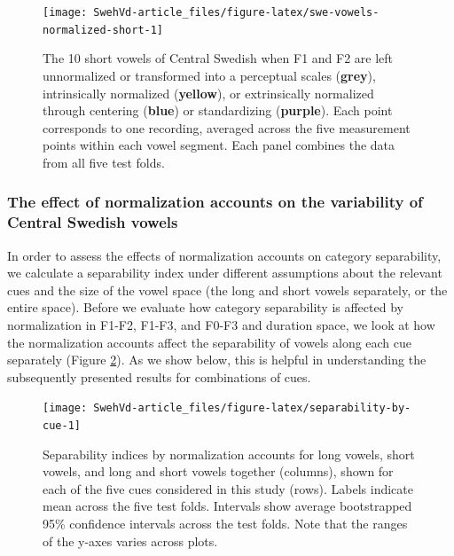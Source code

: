 \documentclass[utf8]{frontiersSCNS}
\begin{document}
\begin{landscape}
\begin{figure}

{\centering \texttt{[image: SwehVd-article\_files/figure-latex/swe-vowels-normalized-short-1]} 

}

\caption{The 10 short vowels of Central Swedish when F1 and F2 are left unnormalized or transformed into a perceptual scales (\textbf{grey}), intrinsically normalized (\textbf{yellow}), or extrinsically normalized through centering (\textbf{blue}) or standardizing (\textbf{purple}). Each point corresponds to one recording, averaged across the five measurement points within each vowel segment. Each panel combines the data from all five test folds.}\label{fig:swe-vowels-normalized-short}
\end{figure}

\end{landscape}

\hypertarget{sec:normVariability}{%
\subsubsection*{The effect of normalization accounts on the variability of Central Swedish vowels}\label{sec:normVariability}}

In order to assess the effects of normalization accounts on category separability, we calculate a separability index under different assumptions about the relevant cues and the size of the vowel space (the long and short vowels separately, or the entire space). Before we evaluate how category separability is affected by normalization in F1-F2, F1-F3, and F0-F3 and duration space, we look at how the normalization accounts affect the separability of vowels along each cue separately (Figure \ref{fig:separability-by-cue}). As we show below, this is helpful in understanding the subsequently presented results for combinations of cues.



\begin{figure}

{\centering \texttt{[image: SwehVd-article\_files/figure-latex/separability-by-cue-1]} 

}

\caption{Separability indices by normalization accounts for long vowels, short vowels, and long and short vowels together (columns), shown for each of the five cues considered in this study (rows). Labels indicate mean across the five test folds. Intervals show average bootstrapped 95\% confidence intervals across the test folds. Note that the ranges of the y-axes varies across plots.}\label{fig:separability-by-cue}
\end{figure}
\end{document}
